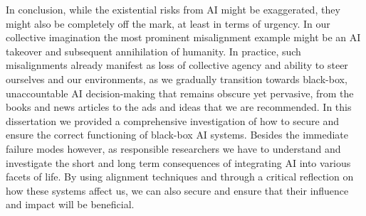 In conclusion, while the existential risks from AI might be exaggerated, they might also be completely off the mark, at least in terms of urgency.
In our collective imagination the most prominent misalignment example might be an \gls{AI} takeover and subsequent annihilation of humanity.
In practice, such misalignments already manifest as loss of collective agency and ability to steer ourselves and our environments, as we gradually transition towards black-box, unaccountable \gls{AI} decision-making that remains obscure yet pervasive, from the books and news articles to the ads and ideas that we are recommended.
In this dissertation we provided a comprehensive investigation of how to secure and ensure the correct functioning of black-box \gls{AI} systems.
Besides the immediate failure modes however, as responsible researchers we have to understand and investigate the short and long term consequences of integrating \gls{AI} into various facets of life.
By using alignment techniques and through a critical reflection on how these systems affect us, we can also secure and ensure that their influence and impact will be beneficial.

\cleardoublepage